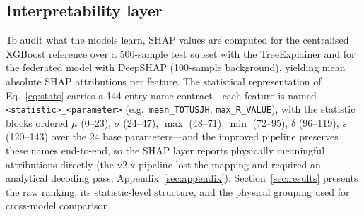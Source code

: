 \subsection{Interpretability layer}

To audit what the models learn, SHAP values \cite{lundberg2017} are
computed for the centralised XGBoost reference over a 500-sample test
subset with the TreeExplainer and for the federated model with DeepSHAP
(100-sample background), yielding mean absolute SHAP attributions per
feature. The statistical representation of Eq.~\eqref{eq:stats}
carries a 144-entry name contract---each feature is named
\texttt{<statistic>\_<parameter>} (e.g.\ \texttt{mean\_TOTUSJH},
\texttt{max\_R\_VALUE}), with the statistic blocks ordered $\mu$
(0--23), $\sigma$ (24--47), $\max$ (48--71), $\min$ (72--95), $\delta$
(96--119), $s$ (120--143) over the 24 base parameters---and the
improved pipeline preserves these names end-to-end, so the SHAP layer
reports physically meaningful attributions directly (the v2.x pipeline
lost the mapping and required an analytical decoding pass;
Appendix~\ref{sec:appendix}). Section~\ref{sec:results} presents the
raw ranking, its statistic-level structure, and the physical grouping
used for cross-model comparison.
